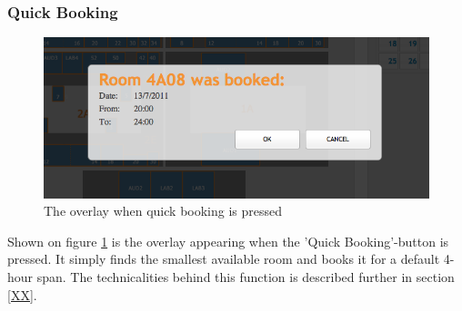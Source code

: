 \subsubsection*{Quick Booking}
\begin{figure}[htb]
\begin{center}
\leavevmode
\includegraphics[width=1\textwidth]{images/quick_booking}
\end{center}
\caption{The overlay when quick booking is pressed}
\label{fig:quick_overlay}
\end{figure}
Shown on figure \ref{fig:quick_overlay} is the overlay appearing when the 'Quick Booking'-button is pressed.
It simply finds the smallest available room and books it for a default 4-hour span. The technicalities behind this function is described further in section \ref{XX}.

\pagebreak

